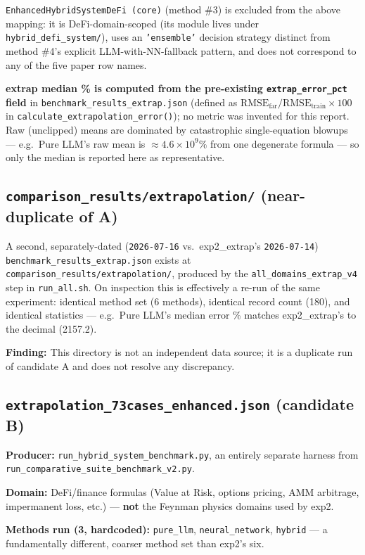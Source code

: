 \documentclass[11pt]{article}
\newcommand{\finding}[1]{\par\noindent\textbf{\textcolor{red!60!black}{Finding: }}#1\par}
\newcommand{\code}[1]{\texttt{#1}}
\begin{document}
\code{EnhancedHybridSystemDeFi (core)} (method \#3) is excluded from the
above mapping: it is DeFi-domain-scoped (its module lives under
\code{hybrid\_defi\_system/}), uses an \code{'ensemble'} decision strategy
distinct from method \#4's explicit LLM-with-NN-fallback pattern, and does
not correspond to any of the five paper row names.

\textbf{extrap median \% is computed from the pre-existing
\code{extrap\_error\_pct} field} in \code{benchmark\_results\_extrap.json}
(defined as $\mathrm{RMSE_{far}} / \mathrm{RMSE_{train}} \times 100$ in
\code{calculate\_extrapolation\_error()}); no metric was invented for this
report. Raw (unclipped) means are dominated by catastrophic single-equation
blowups --- e.g.\ Pure LLM's raw mean is $\approx 4.6\times10^{9}\%$ from
one degenerate formula --- so only the median is reported here as
representative.

\subsection{\code{comparison\_results/extrapolation/} (near-duplicate of A)}

A second, separately-dated (\code{2026-07-16} vs.\ exp2\_extrap's
\code{2026-07-14}) \code{benchmark\_results\_extrap.json} exists at
\code{comparison\_results/extrapolation/}, produced by the
\code{all\_domains\_extrap\_v4} step in \code{run\_all.sh}. On inspection
this is effectively a re-run of the same experiment: identical method set
(6 methods), identical record count (180), and identical statistics ---
e.g.\ Pure LLM's median error \% matches exp2\_extrap's to the decimal
(2157.2). \finding{This directory is not an independent data source; it is
a duplicate run of candidate A and does not resolve any discrepancy.}

\subsection{\code{extrapolation\_73cases\_enhanced.json} (candidate B)}

\textbf{Producer:} \code{run\_hybrid\_system\_benchmark.py}, an entirely
separate harness from \code{run\_comparative\_suite\_benchmark\_v2.py}.

\textbf{Domain:} DeFi/finance formulas (Value at Risk, options pricing,
AMM arbitrage, impermanent loss, etc.) --- \textbf{not} the Feynman physics
domains used by exp2.

\textbf{Methods run (3, hardcoded):} \code{pure\_llm}, \code{neural\_network},
\code{hybrid} --- a fundamentally different, coarser method set than exp2's
six.
\end{document}
